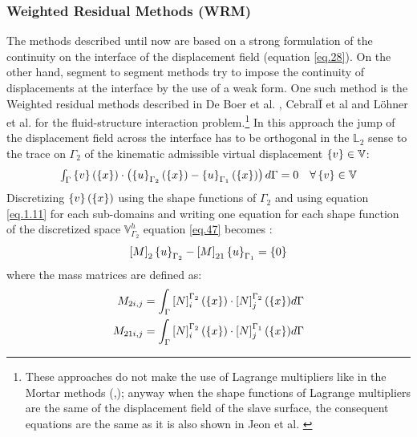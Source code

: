 \subsubsection{Weighted Residual Methods (WRM)}\label{sssec334}
The methods described until now are based on a strong formulation of the continuity on the interface of the displacement field (equation \eqref{eq.28}). On the other hand, segment to segment methods try to impose the continuity of displacements at the interface by the use of a weak form. One such method is the Weighted residual methods described in De Boer et al. \cite{de2007review}, Cebral{\=I} et al \cite{cebrali1997conservative} and  L{\"o}hner et al. \cite{lohner1998fluid} for the fluid-structure interaction problem.\footnote{These approaches do not make the use of Lagrange multipliers like in the Mortar methods (\cite{bernardi1989new},\cite{bernardi1993domain}); anyway when the shape functions of Lagrange multipliers are the same of the displacement field of the slave surface, the consequent equations are the same as it is also shown in Jeon et al. \cite{jeong2017element}} In this approach the jump of the displacement field across the interface has to be orthogonal in the $\mathbb{L}_2$ sense to the trace on $\Gamma_2$ of the kinematic admissible virtual displacement $\left\lbrace{v}\right \rbrace \in \mathbb{V}$:
\begin{equation}
\label{eq.47}
\begin{array}{cc}
  \int_{\Gamma}{\left\lbrace{v}\right \rbrace(\left\lbrace{x}\right \rbrace)\cdot\left(\left\lbrace{u}\right \rbrace_{\Gamma_2}(\left\lbrace{x}\right \rbrace)-\left\lbrace{u}\right \rbrace_{\Gamma_1}(\left\lbrace{x}\right \rbrace) \right)d\Gamma}=0 & \forall \left\lbrace{v}\right \rbrace \in \mathbb{V}    
\end{array}
\end{equation}
Discretizing $\left\lbrace{v}\right \rbrace(\left\lbrace{x}\right \rbrace)$ using the shape functions of $\Gamma_2$  and using equation \eqref{eq.1.11} for each sub-domains and writing one equation for each shape function of the discretized space $\mathbb{V}^h_{\Gamma_2}$ equation \eqref{eq.47} becomes :
\begin{equation}
\label{eq.48}
\left[{M}\right]_2\left\lbrace{u}\right \rbrace_{\Gamma_2}-\left[{M}\right]_{21}\left\lbrace{u}\right \rbrace_{\Gamma_1}=\left\lbrace{0}\right \rbrace
\end{equation}
where the mass matrices are defined as:
\begin{eqnarray}
\label{eq.49}
M_{2i,j}=\int_{\Gamma}\left[{N}\right]_{i}^{\Gamma_2}(\left\lbrace{x}\right \rbrace)\cdot\left[{N}\right]_{j}^{\Gamma_2}(\left\lbrace{x}\right \rbrace)d\Gamma\\
\label{eq.50}
M_{21i,j}=\int_{\Gamma}\left[{N}\right]_{i}^{\Gamma_2}(\left\lbrace{x}\right \rbrace)\cdot\left[{N}\right]_{j}^{\Gamma_1}(\left\lbrace{x}\right \rbrace)d\Gamma
\end{eqnarray}
